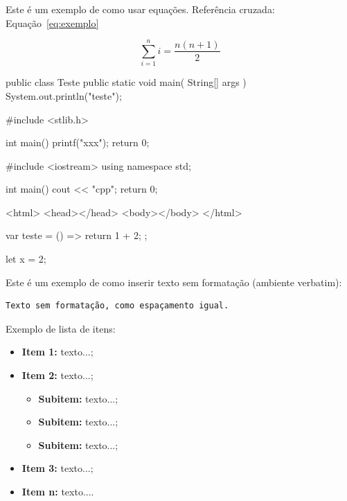 Este é um exemplo de como usar equações. Referência cruzada: Equação~\ref{eq:exemplo}

\begin{equation}
\sum_{i=1}^{n} i = \frac{n(n+1)}{2}
\label{eq:exemplo}
\end{equation}


\begin{inlineJavaCode}
public class Teste {
    public static void main( String[] args ) {
        System.out.println("teste");
    }
}
\end{inlineJavaCode}

\begin{inlineCCode}
#include <stlib.h>

int main() {
    printf("xxx");
    return 0;
}
\end{inlineCCode}

\begin{inlineCPPCode}
#include <iostream>
using namespace std;

int main() {
    cout << "cpp";
    return 0;
}
\end{inlineCPPCode}

\begin{inlineHTMLCode}
<html>
    <head></head>
    <body></body>
</html>
\end{inlineHTMLCode}

\begin{inlineJavascriptCode}
var teste = () => {
    return 1 + 2;
};

let x = 2;
\end{inlineJavascriptCode}



Este é um exemplo de como inserir texto sem formatação (ambiente verbatim):

\begin{verbatim}
Texto sem formatação, como espaçamento igual.
\end{verbatim}


Exemplo de lista de itens:

\begin{itemize}
    \item \textbf{Item 1:} texto...;
    \item \textbf{Item 2:} texto...;
    \begin{itemize}
        \item \textbf{Subitem:} texto...;
        \item \textbf{Subitem:} texto...;
        \item \textbf{Subitem:} texto...;
    \end{itemize}
    \item \textbf{Item 3:} texto...;
    \item \textbf{Item n:} texto....
\end{itemize}


